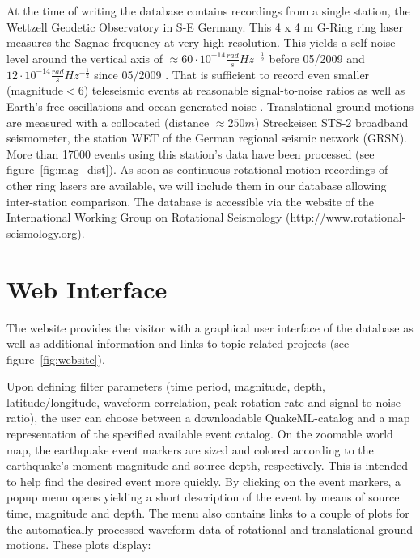 \documentclass[12pt,reqno,letter]{article}
\begin{document}
At the time of writing the database contains recordings from a single station, the Wettzell Geodetic Observatory in S-E Germany. This 4 x 4 m G-Ring ring laser measures the Sagnac frequency at very high resolution. This yields a self-noise level around the vertical axis of $\approx60\cdot10^{-14}\frac{rad}{s}Hz^{-\frac{1}{2}}$ before 05/2009 and $12\cdot10^{-14}\frac{rad}{s}Hz^{-\frac{1}{2}}$ since 05/2009 \citep{Schreiber2013}. That is sufficient to record even smaller (magnitude$<$6) teleseismic events at reasonable signal-to-noise ratios as well as Earth's free oscillations \citep{Igel2011} and ocean-generated noise \citep{Hadziioannou2012}.
Translational ground motions are measured with a collocated (distance $\approx250m$) Streckeisen STS-2 broadband seismometer, the station WET of the German regional seismic network (GRSN). More than 17000 events using this station's data have been processed (see figure~\ref{fig:mag_dist}). As soon as continuous rotational motion recordings of other ring lasers are available, we will include them in our database allowing inter-station comparison. The database is accessible via the website of the International Working Group on Rotational Seismology (http://www.rotational-seismology.org).\\
%
%
\section*{Web Interface}
\label{sec:website}
The website provides the visitor with a graphical user interface of the database as well as additional information and links to topic-related projects (see figure~\ref{fig:website}).

Upon defining filter parameters (time period, magnitude, depth, latitude/longitude, waveform correlation, peak rotation rate and signal-to-noise ratio), the user can choose between a downloadable QuakeML-catalog and a map representation of the specified available event catalog. On the zoomable world map, the earthquake event markers are sized and colored according to the earthquake’s moment magnitude and source depth, respectively. This is intended to help find the desired event more quickly.
By clicking on the event markers, a popup menu opens yielding a short description of the event by means of source time, magnitude and depth. The menu also contains links to a couple of plots for the automatically processed waveform data of rotational and translational ground motions. These plots display:
\end{document}
